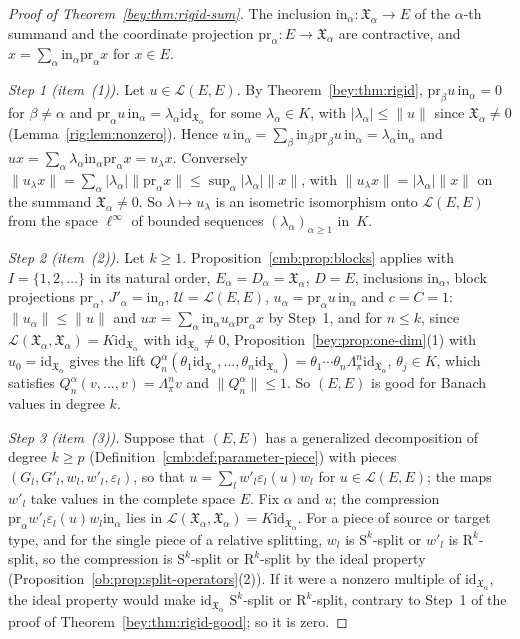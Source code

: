 \documentclass[11pt]{amsart}
\theoremstyle{definition}
\theoremstyle{remark}
\numberwithin{equation}{section}
\newcommand{\cL}{\mathcal L}
\newcommand{\linf}{\ell^\infty}
\newcommand{\id}{\mathrm{id}}
\newcommand{\abs}[1]{\lvert #1\rvert}
\newcommand{\norm}[1]{\lVert #1\rVert}
\theoremstyle{plain}
\theoremstyle{definition}
\theoremstyle{plain}
\newcommand{\fX}{\mathfrak X}
\begin{document}
\begin{proof}[Proof of Theorem~\textup{\ref{bey:thm:rigid-sum}}]
The inclusion $\mathrm{in}_\alpha\colon\fX_\alpha\to E$ of the $\alpha$\nobreakdash-th summand and the coordinate
projection $\mathrm{pr}_\alpha\colon E\to\fX_\alpha$ are contractive, and $x=\sum_\alpha\mathrm{in}_\alpha\mathrm{pr}_\alpha x$
for $x\in E$.

\emph{Step 1 (item~(1)).} Let $u\in\cL(E,E)$. By Theorem~\ref{bey:thm:rigid}, $\mathrm{pr}_\beta u\,\mathrm{in}_\alpha=0$
for $\beta\ne\alpha$ and $\mathrm{pr}_\alpha u\,\mathrm{in}_\alpha=\lambda_\alpha\id_{\fX_\alpha}$ for some
$\lambda_\alpha\in K$, with $\abs{\lambda_\alpha}\le\norm u$ since $\fX_\alpha\ne0$ (Lemma~\ref{rig:lem:nonzero}). Hence
$u\,\mathrm{in}_\alpha=\sum_\beta\mathrm{in}_\beta\mathrm{pr}_\beta u\,\mathrm{in}_\alpha=\lambda_\alpha\mathrm{in}_\alpha$
and $ux=\sum_\alpha\lambda_\alpha\mathrm{in}_\alpha\mathrm{pr}_\alpha x=u_\lambda x$. Conversely $\norm{u_\lambda x}=\sum_\alpha\abs{\lambda_\alpha}\norm{\mathrm{pr}_\alpha x}\le\sup_\alpha\abs{\lambda_\alpha}\norm x$,
with $\norm{u_\lambda x}=\abs{\lambda_\alpha}\norm x$ on the summand $\fX_\alpha\ne0$. So $\lambda\mapsto u_\lambda$ is an
isometric isomorphism onto $\cL(E,E)$ from the space $\linf$ of bounded sequences $(\lambda_\alpha)_{\alpha\ge1}$ in~$K$.

\emph{Step 2 (item~(2)).} Let $k\ge1$. Proposition~\ref{cmb:prop:blocks} applies with $I=\{1,2,\dots\}$ in its natural
order, $E_\alpha=D_\alpha=\fX_\alpha$, $D=E$, inclusions $\mathrm{in}_\alpha$, block projections $\mathrm{pr}_\alpha$,
$J'_\alpha=\mathrm{in}_\alpha$, $\mathcal U=\cL(E,E)$, $u_\alpha=\mathrm{pr}_\alpha u\,\mathrm{in}_\alpha$ and $c=C=1$:
$\norm{u_\alpha}\le\norm u$ and $ux=\sum_\alpha\mathrm{in}_\alpha u_\alpha\mathrm{pr}_\alpha x$ by Step~1, and for
$n\le k$, since $\cL(\fX_\alpha,\fX_\alpha)=K\id_{\fX_\alpha}$ with $\id_{\fX_\alpha}\ne0$,
Proposition~\ref{bey:prop:one-dim}(1) with $u_0=\id_{\fX_\alpha}$ gives the lift
$Q^\alpha_n(\theta_1\id_{\fX_\alpha},\dots,\theta_n\id_{\fX_\alpha})=\theta_1\cdots\theta_n\Lambda^n_\pi\id_{\fX_\alpha}$,
$\theta_j\in K$, which satisfies $Q^\alpha_n(v,\dots,v)=\Lambda^n_\pi v$ and $\norm{Q^\alpha_n}\le1$. So $(E,E)$ is good
for Banach values in degree $k$.

\emph{Step 3 (item~(3)).} Suppose that $(E,E)$ has a generalized decomposition of degree $k\ge p$
(Definition~\ref{cmb:def:parameter-piece}) with pieces $(G_l,G'_l,w_l,w'_l,\varepsilon_l)$, so that
$u=\sum_lw'_l\varepsilon_l(u)w_l$ for $u\in\cL(E,E)$; the maps $w'_l$ take values in the complete space $E$. Fix $\alpha$
and $u$; the compression $\mathrm{pr}_\alpha w'_l\varepsilon_l(u)w_l\mathrm{in}_\alpha$ lies in
$\cL(\fX_\alpha,\fX_\alpha)=K\id_{\fX_\alpha}$. For a piece of source or target type, and for the single piece of a
relative splitting, $w_l$ is $\mathrm S^k$-split or $w'_l$ is $\mathrm R^k$-split, so the compression is
$\mathrm S^k$-split or $\mathrm R^k$-split by the ideal property (Proposition~\ref{ob:prop:split-operators}(2)). If it
were a nonzero multiple of $\id_{\fX_\alpha}$, the ideal property would make $\id_{\fX_\alpha}$ $\mathrm S^k$-split or
$\mathrm R^k$-split, contrary to Step~1 of the proof of Theorem~\ref{bey:thm:rigid-good}; so it is zero.


\end{proof}
\end{document}
